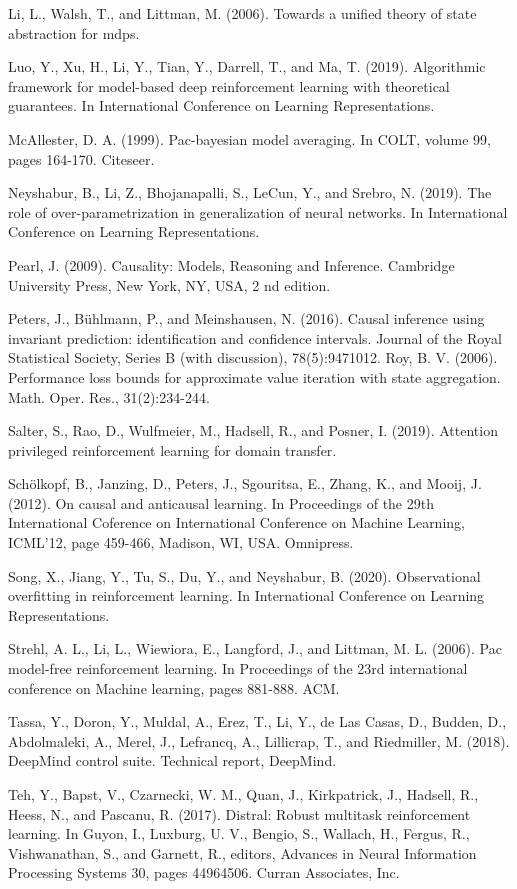 \documentclass[10pt]{article}
\begin{document}
Li, L., Walsh, T., and Littman, M. (2006). Towards a unified theory of state abstraction for mdps.

Luo, Y., Xu, H., Li, Y., Tian, Y., Darrell, T., and Ma, T. (2019). Algorithmic framework for model-based deep reinforcement learning with theoretical guarantees. In International Conference on Learning Representations.

McAllester, D. A. (1999). Pac-bayesian model averaging. In COLT, volume 99, pages 164-170. Citeseer.

Neyshabur, B., Li, Z., Bhojanapalli, S., LeCun, Y., and Srebro, N. (2019). The role of over-parametrization in generalization of neural networks. In International Conference on Learning Representations.

Pearl, J. (2009). Causality: Models, Reasoning and Inference. Cambridge University Press, New York, NY, USA, 2 nd edition.

Peters, J., Bühlmann, P., and Meinshausen, N. (2016). Causal inference using invariant prediction: identification and confidence intervals. Journal of the Royal Statistical Society, Series B (with discussion), 78(5):9471012. Roy, B. V. (2006). Performance loss bounds for approximate value iteration with state aggregation. Math. Oper. Res., 31(2):234-244.

Salter, S., Rao, D., Wulfmeier, M., Hadsell, R., and Posner, I. (2019). Attention privileged reinforcement learning for domain transfer.

Schölkopf, B., Janzing, D., Peters, J., Sgouritsa, E., Zhang, K., and Mooij, J. (2012). On causal and anticausal learning. In Proceedings of the 29th International Coference on International Conference on Machine Learning, ICML'12, page 459-466, Madison, WI, USA. Omnipress.

Song, X., Jiang, Y., Tu, S., Du, Y., and Neyshabur, B. (2020). Observational overfitting in reinforcement learning. In International Conference on Learning Representations.

Strehl, A. L., Li, L., Wiewiora, E., Langford, J., and Littman, M. L. (2006). Pac model-free reinforcement learning. In Proceedings of the 23rd international conference on Machine learning, pages 881-888. ACM.

Tassa, Y., Doron, Y., Muldal, A., Erez, T., Li, Y., de Las Casas, D., Budden, D., Abdolmaleki, A., Merel, J., Lefrancq, A., Lillicrap, T., and Riedmiller, M. (2018). DeepMind control suite. Technical report, DeepMind.

Teh, Y., Bapst, V., Czarnecki, W. M., Quan, J., Kirkpatrick, J., Hadsell, R., Heess, N., and Pascanu, R. (2017). Distral: Robust multitask reinforcement learning. In Guyon, I., Luxburg, U. V., Bengio, S., Wallach, H., Fergus, R., Vishwanathan, S., and Garnett, R., editors, Advances in Neural Information Processing Systems 30, pages 44964506. Curran Associates, Inc.
\end{document}

